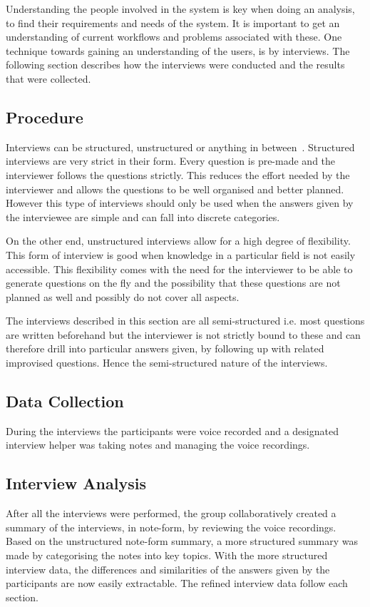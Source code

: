 \label{interviews}

Understanding the people involved in the system is key when doing an analysis, to find their requirements and needs of the system. It is important to get an understanding of current workflows and problems associated with these. One technique towards gaining an understanding of the users, is by interviews. The following section describes how the interviews were conducted and the results that were collected.

\subsection{Procedure}
\label{sub:procedure}
Interviews can be structured, unstructured or anything in between~\cite{benyon2013designing}. Structured interviews are very strict in their form. Every question is pre-made and the interviewer follows the questions strictly. This reduces the effort needed by the interviewer and allows the questions to be well organised and better planned. However this type of interviews should only be used when the answers given by the interviewee are simple and can fall into discrete categories.

On the other end, unstructured interviews allow for a high degree of flexibility. This form of interview is good when knowledge in a particular field is not easily accessible. This flexibility comes with the need for the interviewer to be able to generate questions on the fly and the possibility that these questions are not planned as well and possibly do not cover all aspects.

The interviews described in this section are all semi-structured i.e. most questions are written beforehand but the interviewer is not strictly bound to these and can therefore drill into particular answers given, by following up with related improvised questions. Hence the semi-structured nature of the interviews.

\subsection{Data Collection}
\label{sub:data_collection}
During the interviews the participants were voice recorded and a designated interview helper was taking notes and managing the voice recordings.

\subsection{Interview Analysis}
\label{sub:interview_analysis}
After all the interviews were performed, the group collaboratively created a summary of the interviews, in note-form, by reviewing the voice recordings. Based on the unstructured note-form summary, a more structured summary was made by categorising the notes into key topics. With the more structured interview data, the differences and similarities of the answers given by the participants are now easily extractable. The refined interview data follow each section.

